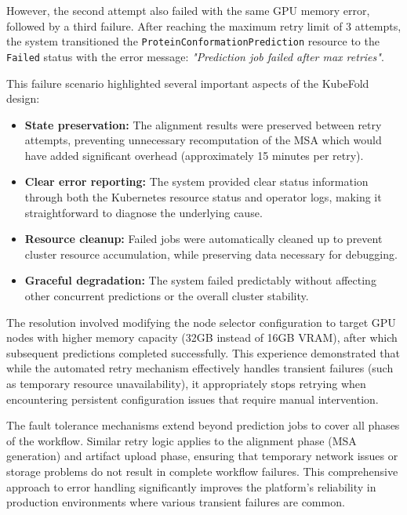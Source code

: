 However, the second attempt also failed with the same GPU memory error, followed by a third failure. After reaching the maximum retry limit of 3 attempts, the system transitioned the \texttt{ProteinConformationPrediction} resource to the \texttt{Failed} status with the error message: \textit{"Prediction job failed after max retries"}.

This failure scenario highlighted several important aspects of the KubeFold design:

\begin{itemize}
    \item \textbf{State preservation:} The alignment results were preserved between retry attempts, preventing unnecessary recomputation of the MSA which would have added significant overhead (approximately 15 minutes per retry).
    
    \item \textbf{Clear error reporting:} The system provided clear status information through both the Kubernetes resource status and operator logs, making it straightforward to diagnose the underlying cause.
    
    \item \textbf{Resource cleanup:} Failed jobs were automatically cleaned up to prevent cluster resource accumulation, while preserving data necessary for debugging.
    
    \item \textbf{Graceful degradation:} The system failed predictably without affecting other concurrent predictions or the overall cluster stability.
\end{itemize}

The resolution involved modifying the node selector configuration to target GPU nodes with higher memory capacity (32GB instead of 16GB VRAM), after which subsequent predictions completed successfully. This experience demonstrated that while the automated retry mechanism effectively handles transient failures (such as temporary resource unavailability), it appropriately stops retrying when encountering persistent configuration issues that require manual intervention.

The fault tolerance mechanisms extend beyond prediction jobs to cover all phases of the workflow. Similar retry logic applies to the alignment phase (MSA generation) and artifact upload phase, ensuring that temporary network issues or storage problems do not result in complete workflow failures. This comprehensive approach to error handling significantly improves the platform's reliability in production environments where various transient failures are common.

